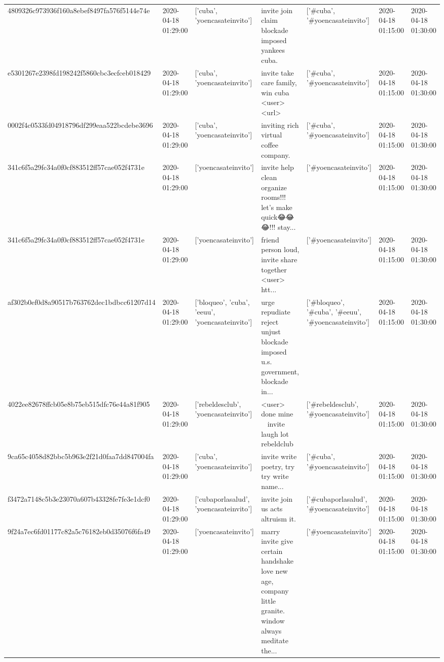 \begin{tabular}{lllllll}
4809326c973936f160a8ebef8497fa576f5144e74e & 2020-04-18 01:29:00 & ['cuba', 'yoencasateinvito'] & invite join claim blockade imposed yankees cuba. & ['#cuba', '#yoencasateinvito'] & 2020-04-18 01:15:00 & 2020-04-18 01:30:00 \\
e5301267e2398fd198242f5860cbc3ecfceb018429 & 2020-04-18 01:29:00 & ['cuba', 'yoencasateinvito'] & invite take care family, win cuba <user> <url> & ['#cuba', '#yoencasateinvito'] & 2020-04-18 01:15:00 & 2020-04-18 01:30:00 \\
0002f4c0533fd04918796df299eaa522bcdebe3696 & 2020-04-18 01:29:00 & ['cuba', 'yoencasateinvito'] & inviting rich virtual coffee company. & ['#cuba', '#yoencasateinvito'] & 2020-04-18 01:15:00 & 2020-04-18 01:30:00 \\
341c6f5a29fc34a0f0cf883512ff57cae052f4731e & 2020-04-18 01:29:00 & ['yoencasateinvito'] & invite help clean organize rooms!!! let's make quick😂😂😂!!! stay... & ['#yoencasateinvito'] & 2020-04-18 01:15:00 & 2020-04-18 01:30:00 \\
341c6f5a29fc34a0f0cf883512ff57cae052f4731e & 2020-04-18 01:29:00 & ['yoencasateinvito'] & friend person loud, invite share together <user> htt... & ['#yoencasateinvito'] & 2020-04-18 01:15:00 & 2020-04-18 01:30:00 \\
af302b0ef0d8a90517b763762dec1bdbcc61207d14 & 2020-04-18 01:29:00 & ['bloqueo', 'cuba', 'eeuu', 'yoencasateinvito'] & urge repudiate reject unjust blockade imposed u.s. government, blockade in... & ['#bloqueo', '#cuba', '#eeuu', '#yoencasateinvito'] & 2020-04-18 01:15:00 & 2020-04-18 01:30:00 \\
4022ee82678ffcb05e8b75eb515dfc76e44a81f905 & 2020-04-18 01:29:00 & ['rebeldesclub', 'yoencasateinvito'] & <user> done mine 🤣🤣🤣🤣 invite laugh lot rebeldclub & ['#rebeldesclub', '#yoencasateinvito'] & 2020-04-18 01:15:00 & 2020-04-18 01:30:00 \\
9ca65c4058d82bbc5b963e2f21d0faa7dd847004fa & 2020-04-18 01:29:00 & ['cuba', 'yoencasateinvito'] & invite write poetry, try try write name... & ['#cuba', '#yoencasateinvito'] & 2020-04-18 01:15:00 & 2020-04-18 01:30:00 \\
f3472a7148c5b3e23070a607b43328fe7fe3e1dcf0 & 2020-04-18 01:29:00 & ['cubaporlasalud', 'yoencasateinvito'] & invite join us acts altruism it. & ['#cubaporlasalud', '#yoencasateinvito'] & 2020-04-18 01:15:00 & 2020-04-18 01:30:00 \\
9f24a7ec6fd01177c82a5c76182eb0d35076f6fa49 & 2020-04-18 01:29:00 & ['yoencasateinvito'] & marry invite give certain handshake love new age, company little granite. window always meditate the... & ['#yoencasateinvito'] & 2020-04-18 01:15:00 & 2020-04-18 01:30:00 \\

\end{tabular}
